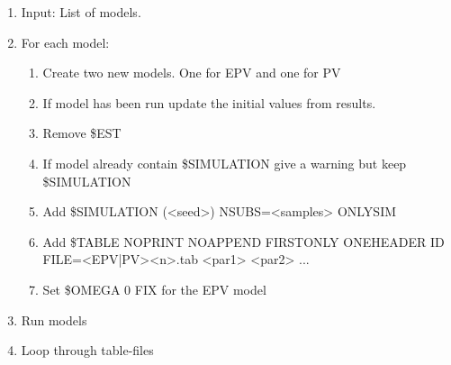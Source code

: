 \begin{enumerate}
	\item Input: List of models.
	\item For each model:
	\begin{enumerate}
		\item Create two new models. One for EPV and one for PV
		\item If model has been run update the initial values from results.
		\item Remove \$EST
		\item If model already contain \$SIMULATION give a warning but keep \$SIMULATION
		\item Add \$SIMULATION (<seed>) NSUBS=<samples> ONLYSIM
		\item Add \$TABLE NOPRINT NOAPPEND FIRSTONLY ONEHEADER ID FILE=<EPV|PV><n>.tab <par1> <par2> ...
		\item Set \$OMEGA 0 FIX for the EPV model
	\end{enumerate}
	\item Run models
	\item Loop through table-files
\end{enumerate}


